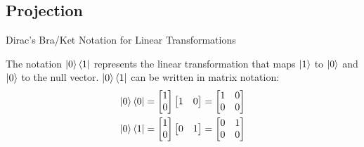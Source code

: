 \documentclass{beamer}
\begin{document}
\subsection{Projection}
\begin{frame}{Dirac's Bra/Ket Notation for Linear Transformations}
  {\tiny
  The notation $\ket{0}\bra{1}$ represents the linear transformation that maps $\ket{1}$ to $\ket{0}$ and $\ket{0}$ to the null vector.
  $\ket{0}\bra{1}$ can be written in matrix notation:
    \begin{align*}
      \ket{0}\bra{0} 
      &=
      \begin{bmatrix}
        1 \\
        0
      \end{bmatrix}
      \begin{bmatrix}
        1 & 0
      \end{bmatrix}
      = \begin{bmatrix}
                        1 & 0 \\
                        0 & 0
                        \end{bmatrix} \\
      \ket{0}\bra{1}
      &= \begin{bmatrix}
        1 \\
        0
      \end{bmatrix}
      \begin{bmatrix}
        0 & 1
      \end{bmatrix}
      = \begin{bmatrix}
                        0 & 1 \\
                        0 & 0
                        \end{bmatrix}
    \end{align*}

}
\end{frame}
\end{document}
